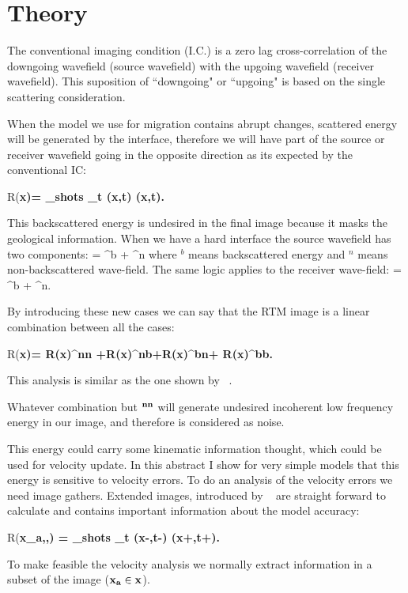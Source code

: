 \section{Theory}

The conventional imaging condition (I.C.) is a zero lag cross-correlation of the downgoing wavefield (source 
wavefield) with the upgoing wavefield (receiver wavefield). This suposition of ``downgoing" or ``upgoing"
is based on the single scattering consideration.

When the model we use for migration contains abrupt changes,  scattered energy will be generated by the interface,
therefore we will have part of the source or receiver wavefield going in the opposite direction as its expected 
by the conventional IC:


\beq
R(\bf{x})= \sum_{shots} \sum_t \US(\bf{x},t) \UR(\bf{x},t).
\label{eq:IC}
\eeq

This backscattered energy is undesired in the final image because it masks the geological information. When we have a 
hard interface the source wavefield has two components:
\beq
\US= \US^b + \US^n
\eeq
where $^b$ means backscattered energy and $^n$ means non-backscattered wave-field. The same logic applies to 
the receiver wave-field:
\beq
\UR= \UR^b + \UR^n.
\eeq

By introducing these new cases we can say that the RTM image is a linear combination between all the cases:

\beq
R(\bf{x})= R(\bf{x})^{nn} +R(\bf{x})^{nb}+R(\bf{x})^{bn}+ R(\bf{x})^{bb}.
\label{eq:cases}
\eeq

This analysis is similar as the one shown by ~\cite{fei:3130}.

Whatever combination but $\bf^{nn}$ will generate undesired incoherent low frequency energy in our image, and therefore
is considered as noise.

This energy could carry some kinematic information thought,  which could be used for velocity update. In this abstract 
I show for very simple models that this energy is sensitive to velocity errors. To do an analysis of the velocity errors we need image gathers.
Extended images, introduced by ~\cite{sava:S209} are straight forward to calculate and contains important information about the model
accuracy:

\beq
R(\bf{x_a},\bf{\lambda},\tau) =  \sum_{shots} \sum_t \US(\bf{x}-\bf{\lambda},t-\tau) \UR(\bf{x}+\bf{\lambda},t+\tau).
\eeq

To make feasible the velocity analysis we normally extract information in a subset of the image ($\bf{x_a} \in \bf{x}$).



